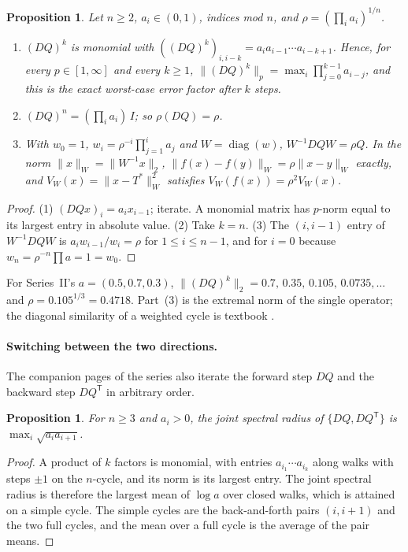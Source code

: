 \documentclass[11pt]{amsart}
\newtheorem{proposition}[theorem]{Proposition}
\theoremstyle{remark}
\begin{document}
\begin{proposition}\label{ti:prop:R1}
Let $n\ge2$, $a_i\in(0,1)$, indices mod $n$, and $\rho=(\prod_ia_i)^{1/n}$.
\begin{enumerate}
\item $(DQ)^k$ is monomial with $((DQ)^k)_{i,i-k}=a_ia_{i-1}\cdots a_{i-k+1}$. Hence, for every
  $p\in[1,\infty]$ and every $k\ge1$, $\|(DQ)^k\|_p=\max_i\prod_{j=0}^{k-1}a_{i-j}$, and this is the
  exact worst-case error factor after $k$ steps.
\item $(DQ)^n=(\prod_ia_i)\,I$; so $\rho(DQ)=\rho$.
\item With $w_0=1$, $w_i=\rho^{-i}\prod_{j=1}^ia_j$ and $W=\operatorname{diag}(w)$,
  $W^{-1}DQW=\rho Q$. In the norm $\|x\|_W=\|W^{-1}x\|_2$, $\|f(x)-f(y)\|_W=\rho\|x-y\|_W$ exactly,
  and $V_W(x)=\|x-T^*\|_W^2$ satisfies $V_W(f(x))=\rho^2V_W(x)$.
\end{enumerate}
\end{proposition}

\begin{proof}
(1) $(DQx)_i=a_ix_{i-1}$; iterate. A monomial matrix has $p$-norm equal to its largest entry in
absolute value. (2) Take $k=n$. (3) The $(i,i-1)$ entry of $W^{-1}DQW$ is $a_iw_{i-1}/w_i=\rho$ for
$1\le i\le n-1$, and for $i=0$ because $w_n=\rho^{-n}\prod a=1=w_0$.
\end{proof}

For Series~II's $a=(0.5,0.7,0.3)$, $\|(DQ)^k\|_2=0.7,\,0.35,\,0.105,\,0.0735,\dots$ and
$\rho=0.105^{1/3}=0.4718$. Part~(3) is the extremal norm of the single operator; the diagonal
similarity of a weighted cycle is textbook \cite{HJ13}.

\paragraph{Switching between the two directions.} The companion pages of the series also iterate
the forward step $DQ$ and the backward step $DQ^{\mathsf T}$ in arbitrary order.

\begin{proposition}\label{ti:prop:R6}
For $n\ge3$ and $a_i>0$, the joint spectral radius of $\{DQ,DQ^{\mathsf T}\}$ is
$\max_i\sqrt{a_ia_{i+1}}$.
\end{proposition}

\begin{proof}
A product of $k$ factors is monomial, with entries $a_{i_1}\cdots a_{i_k}$ along walks with steps
$\pm1$ on the $n$-cycle, and its norm is its largest entry. The joint spectral radius is therefore
the largest mean of $\log a$ over closed walks, which is attained on a simple cycle. The simple
cycles are the back-and-forth pairs $(i,i+1)$ and the two full cycles, and the mean over a full
cycle is the average of the pair means.
\end{proof}
\end{document}
